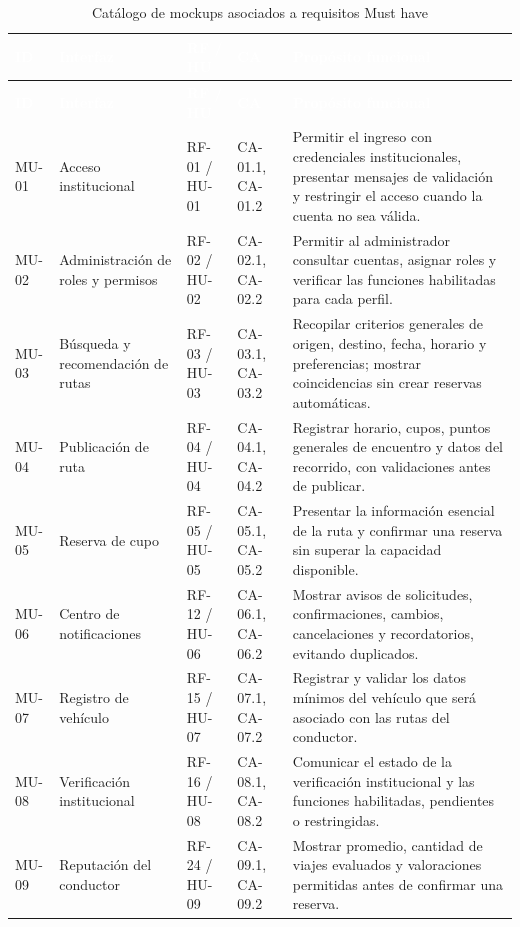\documentclass[12pt,a4paper]{article}
\begin{document}
\begin{longtable}{C{1.20cm} L{3.35cm} L{2.15cm} L{2.25cm} L{4.95cm}}
\caption{Catálogo de mockups asociados a requisitos Must have}\label{tab:catalogo-mockups-must}\\
\textcolor{white}{\textbf{ID}} &
\textcolor{white}{\textbf{Interfaz}} &
\textcolor{white}{\textbf{RF / HU}} &
\textcolor{white}{\textbf{CA}} &
\textcolor{white}{\textbf{Propósito funcional}}\\
\endfirsthead
{}
\textcolor{white}{\textbf{ID}} &
\textcolor{white}{\textbf{Interfaz}} &
\textcolor{white}{\textbf{RF / HU}} &
\textcolor{white}{\textbf{CA}} &
\textcolor{white}{\textbf{Propósito funcional}}\\
\endhead
MU-01 & Acceso institucional & RF-01 / HU-01 & CA-01.1, CA-01.2 & Permitir el ingreso con credenciales institucionales, presentar mensajes de validación y restringir el acceso cuando la cuenta no sea válida.\\
MU-02 & Administración de roles y permisos & RF-02 / HU-02 & CA-02.1, CA-02.2 & Permitir al administrador consultar cuentas, asignar roles y verificar las funciones habilitadas para cada perfil.\\
MU-03 & Búsqueda y recomendación de rutas & RF-03 / HU-03 & CA-03.1, CA-03.2 & Recopilar criterios generales de origen, destino, fecha, horario y preferencias; mostrar coincidencias sin crear reservas automáticas.\\
MU-04 & Publicación de ruta & RF-04 / HU-04 & CA-04.1, CA-04.2 & Registrar horario, cupos, puntos generales de encuentro y datos del recorrido, con validaciones antes de publicar.\\
MU-05 & Reserva de cupo & RF-05 / HU-05 & CA-05.1, CA-05.2 & Presentar la información esencial de la ruta y confirmar una reserva sin superar la capacidad disponible.\\
MU-06 & Centro de notificaciones & RF-12 / HU-06 & CA-06.1, CA-06.2 & Mostrar avisos de solicitudes, confirmaciones, cambios, cancelaciones y recordatorios, evitando duplicados.\\
MU-07 & Registro de vehículo & RF-15 / HU-07 & CA-07.1, CA-07.2 & Registrar y validar los datos mínimos del vehículo que será asociado con las rutas del conductor.\\
MU-08 & Verificación institucional & RF-16 / HU-08 & CA-08.1, CA-08.2 & Comunicar el estado de la verificación institucional y las funciones habilitadas, pendientes o restringidas.\\
MU-09 & Reputación del conductor & RF-24 / HU-09 & CA-09.1, CA-09.2 & Mostrar promedio, cantidad de viajes evaluados y valoraciones permitidas antes de confirmar una reserva.\\
\end{longtable}
\end{document}
